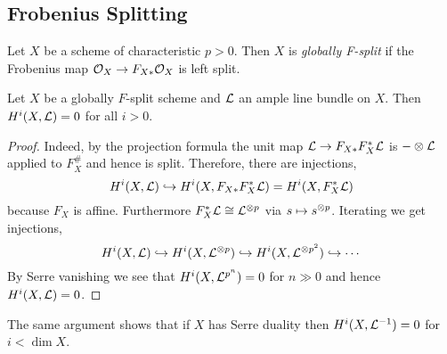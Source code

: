 \documentclass[12pt]{article}
\begin{document}
\subsection{Frobenius Splitting}

\begin{defn}
Let $X$ be a scheme of characteristic $p > 0$. Then $X$ is \textit{globally F-split} if the Frobenius map $\mathcal{O}_{X} \to F_{X*} \mathcal{O}_{X}$ is left split. 
\end{defn}

\begin{prop}
Let $X$ be a globally $F$-split scheme and $\mathcal{L}$ an ample line bundle on $X$. Then $H^i(X, \mathcal{L}) = 0$ for all $i > 0$.
\end{prop}

\begin{proof}
Indeed, by the projection formula the unit map $\mathcal{L} \to F_{X*} F_X^* \mathcal{L}$ is $- \otimes \mathcal{L}$ applied to $F_X^{\#}$ and hence is split. Therefore, there are injections,
\[ H^i(X, \mathcal{L}) \hookrightarrow H^i(X, F_{X*} F_X^* \mathcal{L}) = H^i(X, F_X^* \mathcal{L}) \]
because $F_X$ is affine. Furthermore $F_X^* \mathcal{L} \cong \mathcal{L}^{\otimes p}$ via $s \mapsto s^{\otimes p}$. Iterating we get injections,
\[ H^i(X, \mathcal{L}) \hookrightarrow H^i(X, \mathcal{L}^{\otimes p}) \hookrightarrow H^i(X, \mathcal{L}^{\otimes p^2}) \hookrightarrow \cdots \]
By Serre vanishing we see that $H^i(X, \mathcal{L}^{p^n}) = 0$ for $n \gg 0$ and hence $H^i(X, \mathcal{L}) = 0$.
\end{proof}

\begin{rmk}
The same argument shows that if $X$ has Serre duality then $H^i(X, \mathcal{L}^{-1}) = 0$ for $i < \dim{X}$.
\end{rmk}
\end{document}
